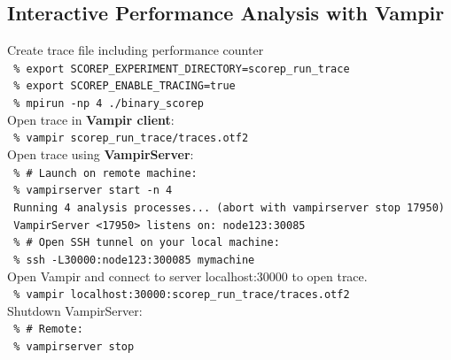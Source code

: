 \subsection{Interactive Performance Analysis with Vampir}
Create trace file including performance counter\\
\texttt{ \% export SCOREP\_EXPERIMENT\_DIRECTORY=scorep\_run\_trace}\\
\texttt{ \% export SCOREP\_ENABLE\_TRACING=true}\\
\texttt{ \% mpirun -np 4 ./binary\_scorep}\\[2ex]

Open trace in \textbf{Vampir client}:\\
\texttt{ \% vampir scorep\_run\_trace/traces.otf2}\\[2ex]

Open trace using \textbf{VampirServer}:\\
\texttt{ \% \# Launch on remote machine:}\\
\texttt{ \% vampirserver start -n 4 }\\
\texttt{ Running 4 analysis processes... (abort with vampirserver stop 17950)}\\
\texttt{ VampirServer <17950> listens on: node123:30085}\\
\texttt{ \% \# Open SSH tunnel on your local machine:}\\
\texttt{ \% ssh -L30000:node123:300085 mymachine}\\[2ex]
Open Vampir and connect to server localhost:30000 to open trace.\\
\texttt{ \% vampir localhost:30000:scorep\_run\_trace/traces.otf2}\\[2ex]
Shutdown VampirServer:\\
\texttt{ \% \# Remote:}\\
\texttt{ \% vampirserver stop}



\vfill
\pagebreak

